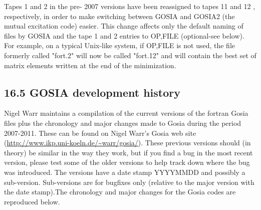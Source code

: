 \documentclass[10pt]{article}
\begin{document}
Tapes 1 and 2 in the pre- 2007 versions have been reassigned to tapes 11 and 12 , respectively, in order to make switching between GOSIA and GOSIA2 (the mutual excitation code) easier. This change affects only the default naming of files by GOSIA and the tape 1 and 2 entries to OP,FILE (optional-see below). For example, on a typical Unix-like system, if OP,FILE is not used, the file formerly called "fort.2" will now be called "fort.12" and will contain the best set of matrix elements written at the end of the minimization.

\subsection*{16.5 GOSIA development history}
Nigel Warr maintains a compilation of the current versions of the fortran Gosia files plus the chronology and major changes made to Gosia during the period 2007-2011. These can be found on Nigel Warr's Gosia web site (\href{http://www.ikp.uni-koeln.de/~warr/gosia/}{http://www.ikp.uni-koeln.de/\~{}warr/gosia/}). These previous versions should (in theory) be similar in the way they work, but if you find a bug in the most recent version, please test some of the older versions to help track down where the bug was introduced. The versions have a date stamp YYYYMMDD and possibly a sub-version. Sub-versions are for bugfixes only (relative to the major version with the date stamp).The chronology and major changes for the Gosia codes are reproduced below.
\end{document}
